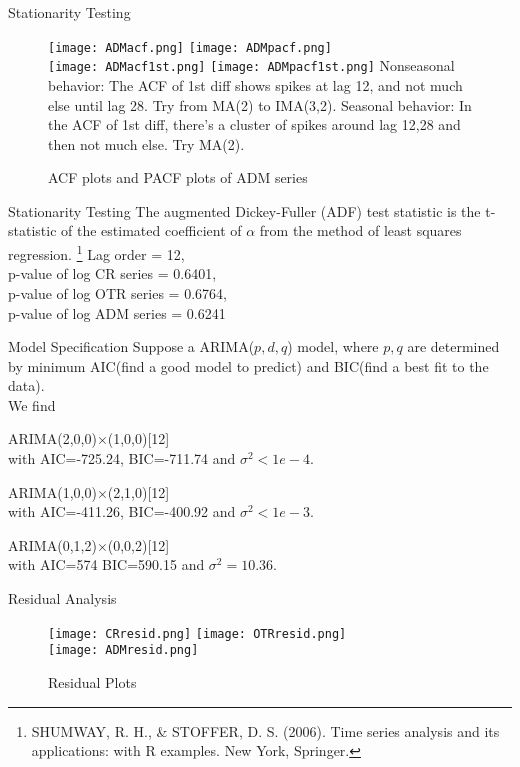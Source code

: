 \documentclass[11pt]{beamer}
\begin{document}
\begin{frame} {Stationarity Testing}
\begin{figure}
\texttt{[image: ADMacf.png]} 
\texttt{[image: ADMpacf.png]} \\
\texttt{[image: ADMacf1st.png]} 
\texttt{[image: ADMpacf1st.png]} 
{\center \small Nonseasonal behavior: The ACF of 1st diff shows spikes at lag 12, and not much else until lag 28.  Try from MA(2) to IMA(3,2).  Seasonal behavior: In the ACF of 1st diff,  there’s a cluster of spikes around lag 12,28 and then not much else.  Try MA(2).}
\caption{ACF plots and PACF plots of ADM series}
\end{figure}
\end{frame}


\begin{frame} {Stationarity Testing}
The augmented Dickey-Fuller (ADF) test statistic is the t-statistic of the estimated coefficient of $\alpha$ from the method of least squares regression.  \footnote{SHUMWAY, R. H., \& STOFFER, D. S. (2006). Time series analysis and its applications: with R examples. New York,  Springer.} 
{ \small Lag order = 12, \\  p-value of log CR series = 0.6401,  \\ p-value of log OTR series = 0.6764,  \\ p-value of log ADM series = 0.6241 }
\end{frame}

\begin{frame} {Model Specification}
Suppose a ARIMA($p,d,q$) model, where $p,q$ are determined by minimum AIC(find a good model to predict) and BIC(find a best fit to the data).\\
We find 
\begin{description}
\item[CR series] ARIMA(2,0,0)$\times$(1,0,0)[12]\\ with AIC=-725.24,  BIC=-711.74 and $\sigma^2<1e-4$.
\item[OTR series] ARIMA(1,0,0)$\times$(2,1,0)[12]\\  with AIC=-411.26,  BIC=-400.92 and $\sigma^2<1e-3$.
\item[ADM series] ARIMA(0,1,2)$\times$(0,0,2)[12]\\ with AIC=574  BIC=590.15 and $\sigma^2=10.36$.
\end{description}
\end{frame}

\begin{frame} {Residual Analysis}
\begin{figure}
\texttt{[image: CRresid.png]} 
\texttt{[image: OTRresid.png]} \\
\texttt{[image: ADMresid.png]} 
\caption{Residual Plots}
\end{figure}
\end{frame}
\end{document}
